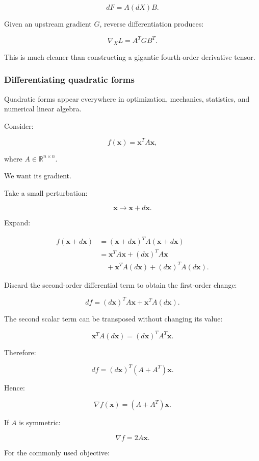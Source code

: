 \[
\boxed{ dF=A(dX)B }.
\]

Given an upstream gradient \(G\), reverse differentiation produces:

\[
\boxed{ \nabla_XL=A^TGB^T }.
\]

This is much cleaner than constructing a gigantic fourth-order derivative tensor.

\subsubsection{Differentiating quadratic forms}\label{differentiating-quadratic-forms}

Quadratic forms appear everywhere in optimization, mechanics, statistics, and numerical linear algebra.

Consider:

\[
f(\mathbf x)=\mathbf x^TA\mathbf x,
\]

where \(A\in\mathbb R^{n\times n}\).

We want its gradient.

Take a small perturbation:

\[
\mathbf x\longrightarrow\mathbf x+d\mathbf x.
\]

Expand:

\[
\begin{aligned} f(\mathbf x+d\mathbf x) &=(\mathbf x+d\mathbf x)^TA(\mathbf x+d\mathbf x)\\ &=\mathbf x^TA\mathbf x +(d\mathbf x)^TA\mathbf x\\ &\quad+\mathbf x^TA(d\mathbf x) +(d\mathbf x)^TA(d\mathbf x). \end{aligned}
\]

Discard the second-order differential term to obtain the first-order change:

\[
df= (d\mathbf x)^TA\mathbf x+ \mathbf x^TA(d\mathbf x).
\]

The second scalar term can be transposed without changing its value:

\[
\mathbf x^TA(d\mathbf x) = (d\mathbf x)^TA^T\mathbf x.
\]

Therefore:

\[
df= (d\mathbf x)^T(A+A^T)\mathbf x.
\]

Hence:

\[
\boxed{ \nabla f(\mathbf x)=(A+A^T)\mathbf x }.
\]

If \(A\) is symmetric:

\[
\boxed{ \nabla f=2A\mathbf x }.
\]

For the commonly used objective:

